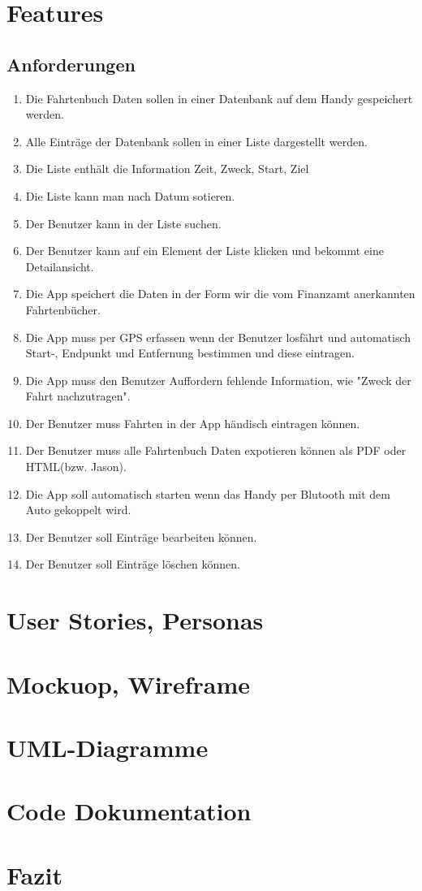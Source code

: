 \documentclass{article}
\begin{document}
\section{Features}
\subsection{Anforderungen}
	\begin{enumerate}
	\item Die Fahrtenbuch Daten sollen in einer Datenbank auf dem Handy gespeichert werden.
	\item Alle Einträge der Datenbank sollen in einer Liste dargestellt werden.
	\item Die Liste enthält die Information Zeit, Zweck, Start, Ziel
	\item Die Liste kann man nach Datum sotieren.
	\item Der Benutzer kann in der Liste suchen.
	\item Der Benutzer kann auf ein Element der Liste klicken und bekommt eine Detailansicht.
	\item Die App speichert die Daten in der Form wir die vom Finanzamt anerkannten Fahrtenbücher.
	\item Die App muss per GPS erfassen wenn der Benutzer losfährt und automatisch Start-, Endpunkt und Entfernung bestimmen und diese eintragen.
	\item Die App muss den Benutzer Auffordern fehlende Information, wie "Zweck der Fahrt nachzutragen".
	\item Der Benutzer muss Fahrten in der App händisch eintragen können.
	\item Der Benutzer muss alle Fahrtenbuch Daten expotieren können als PDF oder HTML(bzw. Jason).
	\item Die App soll automatisch starten wenn das Handy per Blutooth mit dem Auto gekoppelt wird.
	\item Der Benutzer soll Einträge bearbeiten können.
	\item Der Benutzer soll Einträge löschen können.
	\end{enumerate}

\section{User Stories, Personas}

\section{Mockuop, Wireframe}

\section{UML-Diagramme}

\section{Code Dokumentation}

\section{Fazit}
\end{document}
